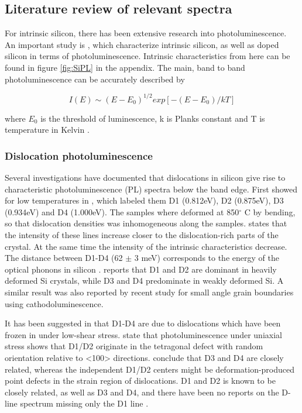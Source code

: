 \subsection{Literature review of relevant spectra}

For intrinsic silicon, there has been extensive research into photoluminescence. An important study is \cite{dean67}, which characterize intrinsic silicon, as well as doped silicon in terms of photoluminescence. Intrinsic characteristics from here can be found in figure \ref{fig:SiPL} in the appendix. The main, band to band photoluminescence can be accurately described by 

\begin{equation}
I(E)\sim(E-E_0)^{1/2}exp[-(E-E_0)/kT]
\label{eq:to_line}
\end{equation}

where $E_0$ is the threshold of luminescence, k is Planks constant and T is temperature in Kelvin \cite{davies88}.

\subsubsection{Dislocation photoluminescence}

Several investigations have documented that dislocations in silicon give rise to characteristic photoluminescence (PL) spectra below the band edge. First showed for low temperatures in \cite{drozdov76}, which labeled them D1 (0.812eV), D2 (0.875eV), D3 (0.934eV) and D4 (1.000eV). The samples where deformed at 850$^\circ$ C by bending, so that dislocation densities was inhomogeneous along the samples. \cite{drozdov76} states that the intensity of these lines increase closer to the dislocation-rich parts of the crystal. At the same time the intensity of the intrinsic characteristics decrease. The distance between D1-D4 (62 $\pm$ 3 meV) corresponds to the energy of the optical phonons in silicon \cite{drozdov76}. \cite{drozdov76} reports that D1 and D2 are dominant in heavily deformed Si crystals, while D3 and D4 predominate in weakly deformed Si. A similar result was also reported by recent study \cite{lee09} for small angle grain boundaries using cathodoluminescence.

It has been suggested in \cite{sauer85} that D1-D4 are due to dislocations which have been frozen in under low-shear stress. \cite{sauer85} state that photoluminescence under uniaxial stress shows that D1/D2 originate in the tetragonal defect with random orientation relative to <100> directions. \cite{sauer85} conclude that D3 and D4 are closely related, whereas the independent D1/D2 centers might be deformation-produced point defects in the strain region of dislocations. D1 and D2 is known to be closely related, as well as D3 and D4, and there have been no reports on the D-line spectrum missing only the D1 line \cite{sugimoto06}.

